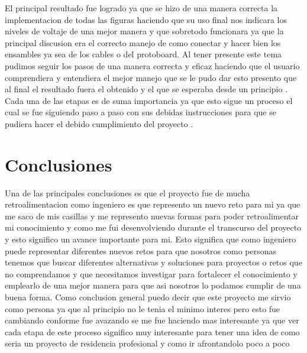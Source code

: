     El principal resultado fue logrado ya que se hizo de una manera correcta la implementacion de todas las figuras haciendo que su uso final nos indicara los niveles de voltaje de una mejor manera y que sobretodo funcionara ya que la principal discusion era el correcto manejo de como conectar y hacer bien los ensambles ya sea de los cables o del protoboard.  \newline
     \newline
    Al tener presente este tema pudimos seguir los pasos de una manera correcta y eficaz haciendo que el usuario comprendiera y entendiera el mejor manejo que se le pudo dar esto presento que al final el resultado fuera el obtenido y el que se esperaba desde un principio .  \newline
     \newline
    Cada una de las etapas es de suma importancia ya que esto sigue un proceso el cual se fue siguiendo paso a paso con sus debidas instrucciones para que se pudiera hacer el debido cumplimiento del proyecto .  \newline
     \newline
    
    
    
    \section{Conclusiones}
    
    Una de las principales conclusiones es que el proyecto fue de mucha retroalimentacion como ingeniero es que represento un nuevo reto para mi ya que me saco de mis casillas y me represento nuevas formas para poder retroalimentar mi conocimiento y como me fui desenvolviendo durante el transcurso del proyecto y esto significo un avance importante para mi. \newline
     \newline
     Esto significa que como ingeniero puede representar diferentes nuevos retos para que nosotros como personas tenemos que buscar diferentes alternativas y soluciones para proyectos o retos que no comprendamos y que necesitamos investigar para fortalecer el conocimiento y emplearlo de una mejor manera para que asi nosotros lo podamos cumplir de una buena forma.  \newline
      \newline
    Como conclusion general puedo decir que este proyecto me sirvio como persona ya que al principio no le tenia el minimo interes pero esto fue cambiando conforme fue avazando se me fue haciendo mas interesante ya que ver cada etapa de este proceso significo muy interesante para tener una idea de como seria un proyecto de residencia profesional y como ir afrontandolo poco a poco  \newline
    
